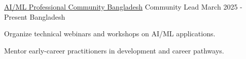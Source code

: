 


\begin{cventries}
\cventry
    {\href{https://aimlcommunity.pythonbd.org/}{AI/ML Professional Community Bangladesh}} %
    {Community Lead} %
    {March 2025 - Present} %
    {Bangladesh} %
    {
      \begin{cvitems} %
        \item{Organize technical webinars and workshops on AI/ML applications.}
        \item{Mentor early-career practitioners in development and career pathways.}
      \end{cvitems}
    }




\end{cventries}

